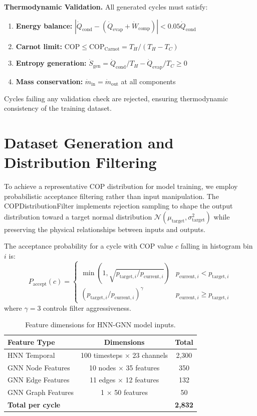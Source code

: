 \documentclass[11pt]{article}
\begin{document}
\textbf{Thermodynamic Validation.} All generated cycles must satisfy:

\begin{enumerate}
\item \textbf{Energy balance:} $|\dot{Q}_{\text{cond}} - (\dot{Q}_{\text{evap}} + \dot{W}_{\text{comp}})| < 0.05 \dot{Q}_{\text{cond}}$
\item \textbf{Carnot limit:} $\text{COP} \leq \text{COP}_{\text{Carnot}} = T_H / (T_H - T_C)$
\item \textbf{Entropy generation:} $\dot{S}_{\text{gen}} = \dot{Q}_{\text{cond}}/T_H - \dot{Q}_{\text{evap}}/T_C \geq 0$
\item \textbf{Mass conservation:} $\dot{m}_{\text{in}} = \dot{m}_{\text{out}}$ at all components
\end{enumerate}

Cycles failing any validation check are rejected, ensuring thermodynamic consistency of the training dataset.

\section{Dataset Generation and Distribution Filtering}

To achieve a representative COP distribution for model training, we employ probabilistic acceptance filtering rather than input manipulation. The COPDistributionFilter implements rejection sampling to shape the output distribution toward a target normal distribution $\mathcal{N}(\mu_{\text{target}}, \sigma_{\text{target}}^2)$ while preserving the physical relationships between inputs and outputs.

The acceptance probability for a cycle with COP value $c$ falling in histogram bin $i$ is:
\begin{equation}
P_{\text{accept}}(c) = \begin{cases} \min(1, \sqrt{p_{\text{target},i} / p_{\text{current},i}}) & p_{\text{current},i} < p_{\text{target},i} \\ (p_{\text{target},i} / p_{\text{current},i})^\gamma & p_{\text{current},i} \geq p_{\text{target},i} \end{cases}
\end{equation}
where $\gamma = 3$ controls filter aggressiveness.

\begin{table}[h]
\caption{Feature dimensions for HNN-GNN model inputs.}
\label{tab:features}
\centering
\begin{tabular}{@{}lcc@{}}
\toprule
\textbf{Feature Type} & \textbf{Dimensions} & \textbf{Total} \\
\midrule
HNN Temporal & 100 timesteps $\times$ 23 channels & 2,300 \\
GNN Node Features & 10 nodes $\times$ 35 features & 350 \\
GNN Edge Features & 11 edges $\times$ 12 features & 132 \\
GNN Graph Features & 1 $\times$ 50 features & 50 \\
\midrule
\textbf{Total per cycle} & & \textbf{2,832} \\
\bottomrule
\end{tabular}
\end{table}
\end{document}
